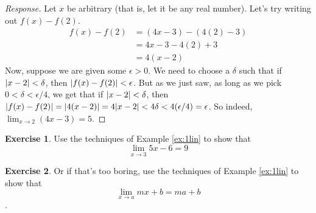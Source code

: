 \documentclass[english]{book}
\DeclarePairedDelimiter\abs{\lvert}{\rvert}%
\theoremstyle{remark}
\theoremstyle{definition}
\newtheorem{excs}{Exercise}[chapter]
\newtheorem*{next week}{Next Week}
\newcommand{\dlim}{\displaystyle\lim}
\begin{document}
\begin{proof}[Response]
	 Let $x$ be arbitrary (that is, let it be any real number). Let's try writing out $f(x)-f(2)$.
	 \begin{align*}
	 	f(x)-f(2)&=(4x-3)-(4(2)-3)\\
	 	&=4x-3-4(2)+3\\
	 	&=4(x-2)
	 \end{align*}
 Now, suppose we are given some $\epsilon>0$. We need to choose a $\delta$ such that if $\abs{x-2}<\delta$, then $\abs{f(x)-f(2)}<\epsilon$. But as we just saw, as long as we pick $0<\delta<\epsilon/4$, we get that if $\abs{x-2}<\delta$, then $\abs{f(x)-f(2)}=\abs{4(x-2)}=4\abs{x-2}<4\delta<4(\epsilon/4)=\epsilon$. So indeed, $\dlim_{x\to 2}(4x-3)=5$. 
\end{proof}

\begin{excs}
	Use the techniques of Example \ref{ex:1lin} to show that $$\lim_{x\to 3}5x-6=9$$
\end{excs}
\begin{excs}
	Or if that's too boring, use the techniques of Example \ref{ex:1lin} to show that $$\lim_{x\to a}mx+b=ma+b$$. 
\end{excs}
\end{document}
